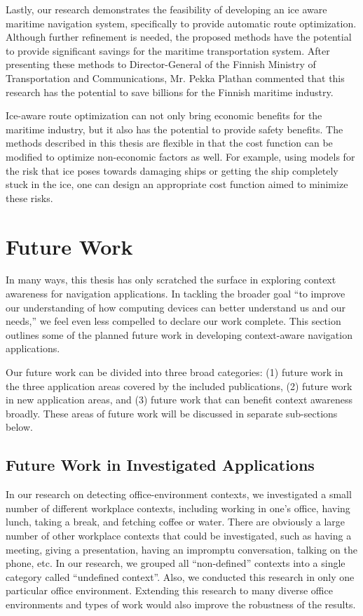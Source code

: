Lastly, our research demonstrates the feasibility of developing an ice aware maritime navigation system, specifically to provide automatic route optimization. Although further refinement is needed, the proposed methods have the potential to provide significant savings for the maritime transportation system. After presenting these methods to Director-General of the Finnish Ministry of Transportation and Communications, Mr. Pekka Plathan commented that this research has the potential to save billions for the Finnish maritime industry.

Ice-aware route optimization can not only bring economic benefits for the maritime industry, but it also has the potential to provide safety benefits. The methods described in this thesis are flexible in that the cost function can be modified to optimize non-economic factors as well. For example, using models for the risk that ice poses towards damaging ships or getting the ship completely stuck in the ice, one can design an appropriate cost function aimed to minimize these risks.

\section{Future Work}
\label{sec:future_work}

In many ways, this thesis has only scratched the surface in exploring context awareness for navigation applications. In tackling the broader goal ``to improve our understanding of how computing devices can better understand us and our needs,'' we feel even less compelled to declare our work complete. This section outlines some of the planned future work in developing context-aware navigation applications.

Our future work can be divided into three broad categories: (1) future work in the three application areas covered by the included publications, (2) future work in new application areas, and (3) future work that can benefit context awareness broadly. These areas of future work will be discussed in separate sub-sections below.
%
\subsection{Future Work in Investigated Applications}
\label{sec:future_applications}

In our research on detecting office-environment contexts, we investigated a small number of different workplace contexts, including working in one's office, having lunch, taking a break, and fetching coffee or water. There are obviously a large number of other workplace contexts that could be investigated, such as having a meeting, giving a presentation, having an impromptu conversation, talking on the phone, etc. In our research, we grouped all ``non-defined'' contexts into a single category called ``undefined context''. Also, we conducted this research in only one particular office environment. Extending this research to many diverse office environments and types of work would also improve the robustness of the results.

